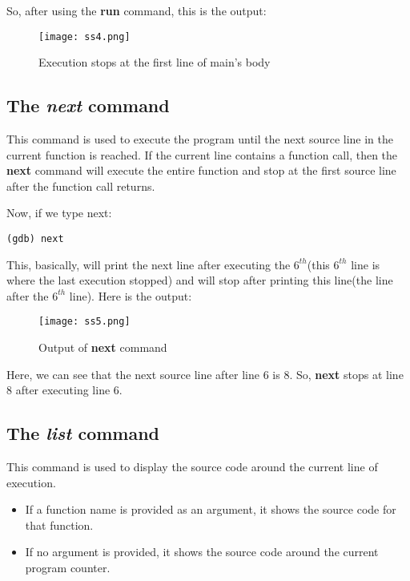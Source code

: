 \documentclass{article}
\makeatletter
\renewcommand\paragraph{\@startsection{paragraph}{4}{\z@}{-3.25ex \@plus -1ex \@minus -.2ex}{1.5ex \@plus .2ex}{\normalfont\normalsize\bfseries}}
\makeatother
\begin{document}
So, after using the \textbf{run} command, this is the output:

\begin{figure}[h]
\centering
\texttt{[image: ss4.png]}
\caption{Execution stops at the first line of main's body}
\end{figure}

\newpage
\subsection{The \textit{next} command}
\paragraph{}
This command is used to execute the program until the next source line in the current function is reached. If the current line contains a function call, then the \textbf{next} command will execute the entire function and stop at the first source line after the function call returns.

Now, if we type next:

\begin{Verbatim}[frame=single]
(gdb) next
\end{Verbatim}
This, basically, will print the next line after executing the $6^{th}$(this $6^{th}$ line is where the last execution stopped) and will stop after printing this line(the line after the $6^{th}$ line).
Here is the output:
\begin{figure}[h]
\centering
\texttt{[image: ss5.png]}
\caption{Output of \textbf{next} command}
\end{figure}

Here, we can see that the next source line after line $6$ is $8$. So, \textbf{next} stops at line $8$ after executing line $6$.

\newpage
\subsection{The \textit{list} command}
\paragraph{}
This command is used to display the source code around the current line of execution.
\begin{itemize}
\item If a function name is provided as an argument, it shows the source code for that function.
\item If no argument is provided, it shows the source code around the current program counter.
\end{itemize}
\end{document}
